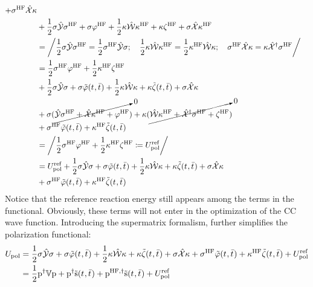 \begin{equation}
\begin{aligned}
  + \sigma^\mathrm{HF}\hat{\mathcal{X}}\kappa \\
&+  \frac{1}{2}\sigma\hat{\mathcal{Y}}\sigma^\mathrm{HF}
  + \sigma\varphi^\mathrm{HF}
  + \frac{1}{2}\kappa\hat{\mathcal{W}}\kappa^\mathrm{HF}
  + \kappa\zeta^\mathrm{HF}
  + \sigma\hat{\mathcal{X}}\kappa^\mathrm{HF} \\
&= \left/
  \frac{1}{2}\sigma\hat{\mathcal{Y}}\sigma^\mathrm{HF}
  =
  \frac{1}{2}\sigma^\mathrm{HF}\hat{\mathcal{Y}}\sigma;\quad
  \frac{1}{2}\kappa\hat{\mathcal{W}}\kappa^\mathrm{HF}
  =
  \frac{1}{2}\kappa^\mathrm{HF}\hat{\mathcal{W}}\kappa; \quad
  \sigma^\mathrm{HF}\hat{\mathcal{X}}\kappa
  =
  \kappa\hat{\mathcal{X}}^\dagger\sigma^\mathrm{HF}
  \right/ \\
&=
    \frac{1}{2}\sigma^\mathrm{HF}\varphi^\mathrm{HF}
  + \frac{1}{2}\kappa^\mathrm{HF}\zeta^\mathrm{HF} \\
&+  \frac{1}{2}\sigma\hat{\mathcal{Y}}\sigma
  + \sigma\tilde{\varphi}(t_{},\bar{t}_{})
  + \frac{1}{2}\kappa\hat{\mathcal{W}}\kappa
  + \kappa\tilde{\zeta}(t_{},\bar{t}_{})
  + \sigma\hat{\mathcal{X}}\kappa \\
  &+ \sigma(\cancelto{0}{\hat{\mathcal{Y}}\sigma^\mathrm{HF} + \hat{\mathcal{X}}\kappa^\mathrm{HF} + \varphi^\mathrm{HF}})
  + \kappa(\cancelto{0}{\hat{\mathcal{W}}\kappa^\mathrm{HF} + \hat{\mathcal{X}}^\dagger\sigma^\mathrm{HF} + \zeta^\mathrm{HF}}) \\
&+ \sigma^\mathrm{HF}\tilde{\varphi}(t_{},\bar{t}_{}) + \kappa^\mathrm{HF}\tilde{\zeta}(t_{},\bar{t}_{}) \\
&= \left/
    \frac{1}{2}\sigma^\mathrm{HF}\varphi^\mathrm{HF}
  + \frac{1}{2}\kappa^\mathrm{HF}\zeta^\mathrm{HF}
  \coloneqq U_\mathrm{pol}^\mathrm{ref}
  \right/ \\
&=
  U_\mathrm{pol}^\mathrm{ref}
  +  \frac{1}{2}\sigma\hat{\mathcal{Y}}\sigma
  + \sigma\tilde{\varphi}(t_{},\bar{t}_{})
  + \frac{1}{2}\kappa\hat{\mathcal{W}}\kappa
  + \kappa\tilde{\zeta}(t_{},\bar{t}_{})
  + \sigma\hat{\mathcal{X}}\kappa \\
&+ \sigma^\mathrm{HF}\tilde{\varphi}(t_{},\bar{t}_{}) + \kappa^\mathrm{HF}\tilde{\zeta}(t_{},\bar{t}_{})
  \end{aligned}
\end{equation}
Notice that the reference reaction energy still appears among the terms
in the functional. Obviously, these terms will not enter in the optimization of
the \acs{CC} wave function.
Introducing the supermatrix formalism, further simplifies the
polarization functional:
\begin{equation}
  \begin{aligned}
  U_\mathrm{pol} &=
    \frac{1}{2}\sigma\hat{\mathcal{Y}}\sigma
    + \sigma\tilde{\varphi}(t_{},\bar{t}_{})
  + \frac{1}{2}\kappa\hat{\mathcal{W}}\kappa
  + \kappa\tilde{\zeta}(t_{},\bar{t}_{})
  + \sigma\hat{\mathcal{X}}\kappa
  + \sigma^\mathrm{HF}\tilde{\varphi}(t_{},\bar{t}_{}) +
  \kappa^\mathrm{HF}\tilde{\zeta}(t_{},\bar{t}_{})
  + U_\mathrm{pol}^\mathrm{ref}
  \\
  &=
  \frac{1}{2}\mathrm{p}^\dagger\mathbb{V}\mathrm{p} + \mathrm{p}^\dagger\tilde{\mathrm{s}}(t_{},\bar{t}_{})
  + \mathrm{p}^{\mathrm{HF}, \dagger}\tilde{\mathrm{s}}(t_{},\bar{t}_{})
  + U_\mathrm{pol}^\mathrm{ref}
\end{aligned}
\end{equation}

